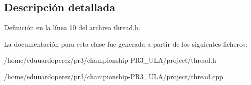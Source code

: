 \subsection{Descripción detallada}


Definición en la línea 10 del archivo thread.\+h.



La documentación para esta clase fue generada a partir de los siguientes ficheros\+:\begin{DoxyCompactItemize}
\item 
/home/eduuardoperez/pr3/championship-\/\+P\+R3\+\_\+\+U\+L\+A/project/thread.\+h\item 
/home/eduuardoperez/pr3/championship-\/\+P\+R3\+\_\+\+U\+L\+A/project/thread.\+cpp\end{DoxyCompactItemize}
